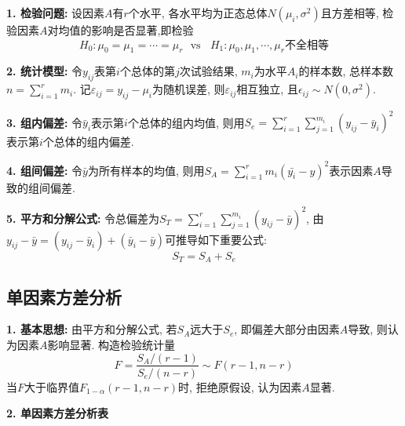 \textbf{1. 检验问题: }设因素$A$有$r$个水平, 各水平均为正态总体$N(\mu_i,\sigma^2)$且方差相等, 检验因素$A$对均值的影响是否显著,即检验
\begin{equation*}
    H_0: \mu_0=\mu_1=\cdots=\mu_r ~~~\text{vs}~~~~H_1:\mu_0,\mu_1,\cdots,\mu_r \text{不全相等}
\end{equation*}

\textbf{2. 统计模型: }令$y_{ij}$表第$i$个总体的第$j$次试验结果, $m_i$为水平$A_i$的样本数, 总样本数$n=\sum\limits_{i=1}^r m_i$. 
记$\varepsilon_{ij}=y_{ij}-\mu_i$为随机误差, 则$\varepsilon_{ij}$相互独立, 且$\epsilon_{ij}\sim N(0,\sigma^2)$.

\textbf{3. 组内偏差: }令$\bar{y}_i$表示第$i$个总体的组内均值, 则用$S_e=\sum\limits_{i=1}^r\sum\limits_{j=1}^{m_i}(y_{ij}-\bar{y}_i)^2$表示第$i$个总体的组内偏差.

\textbf{4. 组间偏差: }令$\bar{y}$为所有样本的均值, 则用$S_A=\sum\limits_{i=1}^r m_i(\bar{y_i}-y)^2$表示因素$A$导致的组间偏差.

\textbf{5. 平方和分解公式: }令总偏差为$S_T=\sum\limits_{i=1}^r\sum\limits_{j=1}^{m_i} (y_{ij}-\bar{y})^2$, 由$y_{ij}-\bar{y}=(y_{ij}-\bar{y}_i)+(\bar{y}_i-\bar{y})$可推导如下重要公式:
\begin{equation*}
    S_T=S_A+S_e
\end{equation*}

\subsection{单因素方差分析}

\textbf{1. 基本思想: }由平方和分解公式, 若$S_A$远大于$S_e$, 即偏差大部分由因素$A$导致, 则认为因素$A$影响显著. 构造检验统计量
\begin{equation*}
    F=\frac{S_A/(r-1)}{S_e/(n-r)} \sim F(r-1,n-r)
\end{equation*}
当$F$大于临界值$F_{1-\alpha}(r-1,n-r)$时, 拒绝原假设, 认为因素$A$显著.

\textbf{2. 单因素方差分析表}
\begin{table}[H]
\end{table}

